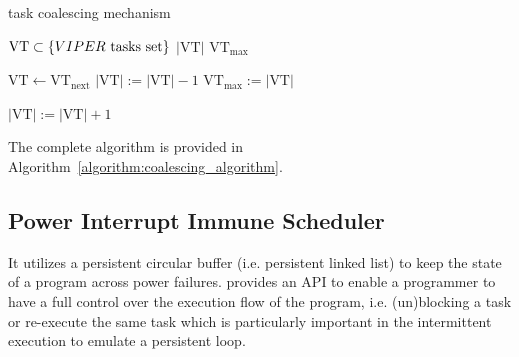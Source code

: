 \begin{algorithm}[t]
	\caption{\sys task coalescing mechanism}
	\label{algorithm:coalescing_algorithm}
	\scriptsize
	\begin{algorithmic}[1]
		\State $\text{VT} \subset \{VIPER~\text{tasks set}\}$  
		\State $|\text{VT}|$ 
		\State $\text{VT}_{\max}$ 
		\vspace{0.1cm}
		
		\State $\text{VT} \leftarrow \text{VT}_{\text{next}}$ 
		\vspace{0.1cm}
		 				
		\State $|\text{VT}|:=|\text{VT}|-1$
		\State $\text{VT}_{\max} := |\text{VT}|$ 
		\EndIf
		\EndWhile
		
		\vspace{0.1cm}
		 
		 
		\State $|\text{VT}|:=|\text{VT}|+1$
		\EndIf
		\EndIf
		\EndWhile
	\end{algorithmic}
\end{algorithm}

The complete algorithm is provided in Algorithm~\ref{algorithm:coalescing_algorithm}. 

\subsection{Power Interrupt Immune Scheduler}


It utilizes a persistent circular buffer (i.e. persistent linked list) to keep the state of a program across power failures. \sys provides an API to enable a programmer to have a full control over the execution flow of the program, i.e. (un)blocking a task or re-execute the same task which is particularly important in the intermittent execution to emulate a persistent loop. 

